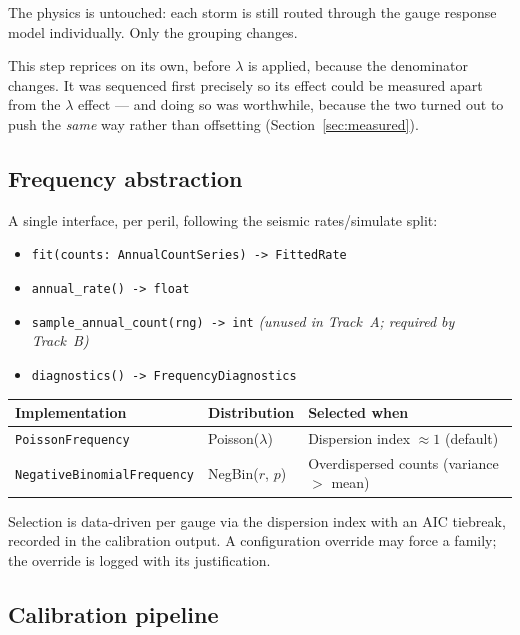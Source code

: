 \documentclass[11pt]{article}
\begin{document}
\noindent The physics is untouched: each storm is still routed through the gauge
response model individually. Only the grouping changes.

This step reprices on its own, before $\lambda$ is applied, because the
denominator changes. It was sequenced first precisely so its effect could be
measured apart from the $\lambda$ effect --- and doing so was worthwhile,
because the two turned out to push the \emph{same} way rather than offsetting
(Section~\ref{sec:measured}).

\subsection{Frequency abstraction}

A single interface, per peril, following the seismic rates/simulate split:

\begin{itemize}[nosep]
  \item \texttt{fit(counts: AnnualCountSeries) -> FittedRate}
  \item \texttt{annual\_rate() -> float}
  \item \texttt{sample\_annual\_count(rng) -> int} \quad \emph{(unused in
        Track~A; required by Track~B)}
  \item \texttt{diagnostics() -> FrequencyDiagnostics}
\end{itemize}

\begin{center}
\begin{tabular}{@{}lll@{}}
\toprule
\textbf{Implementation} & \textbf{Distribution} & \textbf{Selected when} \\
\midrule
\texttt{PoissonFrequency} & Poisson($\lambda$) & Dispersion index $\approx 1$ (default) \\
\texttt{NegativeBinomialFrequency} & NegBin($r$, $p$) & Overdispersed counts (variance $>$ mean) \\
\bottomrule
\end{tabular}
\end{center}

\noindent Selection is data-driven per gauge via the dispersion index with an
AIC tiebreak, recorded in the calibration output. A configuration override may
force a family; the override is logged with its justification.

\subsection{Calibration pipeline}
\end{document}
